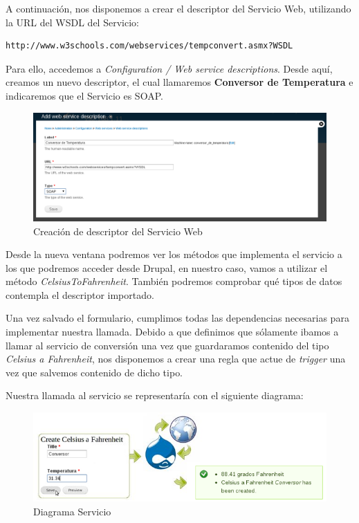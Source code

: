 A continuación, nos disponemos a crear el descriptor del Servicio Web, utilizando la URL del WSDL del Servicio:

\begin{verbatim}
http://www.w3schools.com/webservices/tempconvert.asmx?WSDL
\end{verbatim}

Para ello, accedemos a \textit{Configuration / Web service descriptions}.
Desde aquí, creamos un nuevo descriptor, el cual llamaremos \textbf{Conversor de Temperatura} e indicaremos que el Servicio es SOAP.

\begin{figure}
  \centering
    \includegraphics[width=1\textwidth]{Assets/Soap/Imagenes/crear_descriptor_servicio.png}
  \caption{Creación de descriptor del Servicio Web}
\end{figure}

Desde la nueva ventana podremos ver los métodos que implementa el servicio a los que podremos acceder desde Drupal, 
en nuestro caso, vamos a utilizar el método \textit{CelsiusToFahrenheit}. También podremos comprobar qué tipos de 
datos contempla el descriptor importado. 

Una vez salvado el formulario, cumplimos todas las dependencias necesarias para implementar nuestra llamada. 
Debido a que definimos que sólamente ibamos a llamar al servicio de conversión una vez que guardaramos contenido del tipo 
\textit{Celsius a Fahrenheit}, nos disponemos a crear una regla que actue de \textit{trigger} una vez que salvemos contenido 
de dicho tipo.

Nuestra llamada al servicio se representaría con el siguiente diagrama:

\begin{figure}
  \centering
    \includegraphics[width=1\textwidth]{Assets/Soap/Imagenes/diagrama_soap.png}
  \caption{Diagrama Servicio}
\end{figure}

